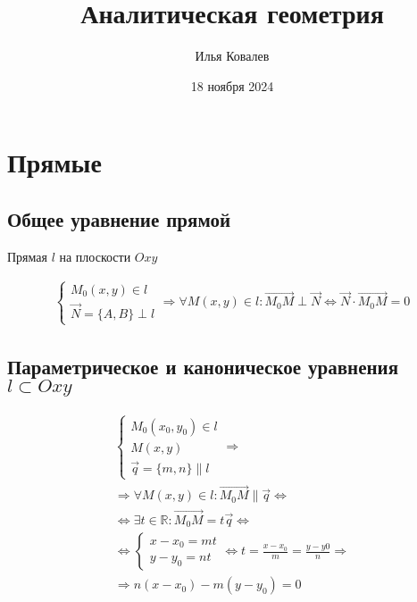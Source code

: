 \documentclass{article}
\begin{document}
\title{Аналитическая геометрия}
\author{Илья Ковалев}
\date{18 ноября 2024}
\maketitle

\section{Прямые}

\subsection{Общее уравнение прямой}

Прямая $l$ на плоскости $Oxy$

\begin{gather*}
	\begin{cases}
		M_0(x, y) \in l \\
		\vec{N} = \{ A, B \} \perp l
	\end{cases} \Rightarrow
	\forall M(x, y) \in l : \vec{M_0 M} \perp \vec{N} \Leftrightarrow \vec{N} \cdot \vec{M_0 M} = 0
\end{gather*}

\subsection{Параметрическое и каноническое уравнения \\
$l \subset Oxy$}

\begin{gather*}
	\begin{cases}
		M_0(x_0, y_0) \in l \\
		M(x, y) \\
		\vec{q} = \{ m, n \} \parallel l
	\end{cases} \Rightarrow \\
	\Rightarrow \forall M(x, y) \in l : \vec{M_0 M} \parallel \vec{q} \Leftrightarrow \\
	\Leftrightarrow \exists t \in \mathbb{R} : \vec{M_0 M} = t \vec{q} \Leftrightarrow \\
	\Leftrightarrow \begin{cases}
		x - x_0 = mt \\
		y - y_0 = nt
	\end{cases} \Leftrightarrow t = \frac{x - x_0}{m} = \frac{y - y0}{n} \Rightarrow \\
	\Rightarrow n(x - x_0) - m(y - y_0) = 0
\end{gather*}
\end{document}
